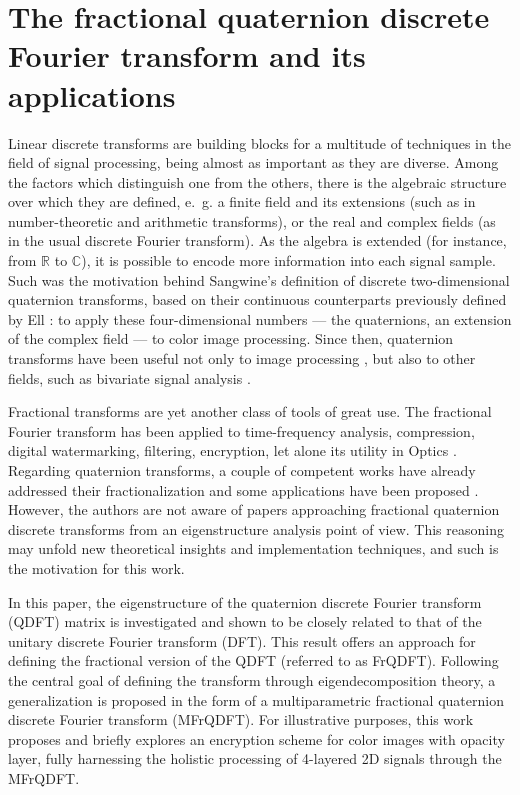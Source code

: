 \chapter{The fractional quaternion discrete Fourier transform and its applications}
\label{ch:FrQDFT}

Linear discrete transforms are building blocks for a multitude of techniques in the field of signal processing, being almost as important as they are diverse. Among the factors which distinguish one from the others, there is the algebraic structure over which they are defined, e.~g. a finite field and its extensions (such as in number-theoretic \cite{blahut2010fast,pedrouzo2017number,chandra2014exact,lima2013} and arithmetic \cite{knockaert1994generalized, rajapaksha2014vlsi} transforms), or the real and complex fields (as in the usual discrete Fourier transform). As the algebra is extended (for instance, from $ \mathbb{R} $ to $ \mathbb{C} $), it is possible to encode more information into each signal sample. Such was the motivation behind Sangwine's definition \cite{sangwine1996fourier} of discrete two-dimensional quaternion transforms, based on their continuous counterparts previously defined by Ell \cite{ell1993quaternion}: to apply these four-dimensional numbers --- the quaternions, an extension of the complex field --- to color image processing. Since then, quaternion transforms have been useful not only to image processing \cite{ell2007hypercomplex,chen2018quaternion,li2013quaternion,evans2000hypercomplex,silva2018}, but also to other fields, such as bivariate signal analysis \cite{flamant2017spectral,flamant2017time,flamant2018complete}.

Fractional transforms are yet another class of tools of great use. The fractional Fourier transform has been applied to time-frequency analysis, compression, digital watermarking, filtering, encryption, let alone its utility in Optics \cite{bultheel2002shattered,figueiredo2018}. Regarding quaternion transforms, a couple of competent works have already addressed their fractionalization \cite{guanlei2008fractional, wei2013different, roopkumar2016quaternionic} and some applications have been proposed \cite{chen2018quaternion}. However, the authors are not aware of papers approaching fractional quaternion discrete transforms from an eigenstructure analysis point of view. This reasoning may unfold new theoretical insights and implementation techniques, and such is the motivation for this work.

In this paper, the eigenstructure of the quaternion discrete Fourier transform (QDFT) matrix is investigated and shown to be closely related to that of the unitary discrete Fourier transform (DFT). This result offers an approach for defining the fractional version of the QDFT (referred to as FrQDFT). Following the central goal of defining the transform through eigendecomposition theory, a generalization is proposed in the form of a multiparametric fractional quaternion discrete Fourier transform (MFrQDFT). For illustrative purposes, this work proposes and briefly explores an encryption scheme for color images with opacity layer, fully harnessing the holistic processing of 4-layered 2D signals through the MFrQDFT.

